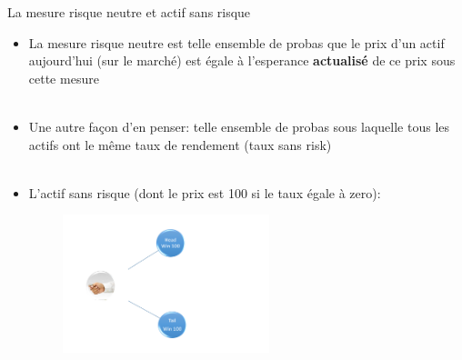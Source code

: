 \documentclass[10pt]{beamer}
\begin{document}
\begin{frame}{La mesure risque neutre et actif sans risque}{}
\begin{block}{}

\scriptsize{  \begin{itemize}
        \item La mesure risque neutre est telle ensemble de probas que le prix d'un actif aujourd'hui (sur le marché) est égale à l'esperance \textbf{actualisé} de ce prix sous cette mesure \\~\\
        
        \item Une autre façon d'en penser: telle ensemble de probas sous laquelle tous les actifs ont le même taux de rendement (taux sans risk) \\~\\
        
        \item L'actif sans risque (dont le prix est 100 si le taux égale à zero):
        
        \includegraphics[width=8cm,height=4cm,keepaspectratio]{AAUgraphics/riskfree.png}
        
   \end{itemize}
    
    }
\end{block}
\end{frame}
\end{document}
